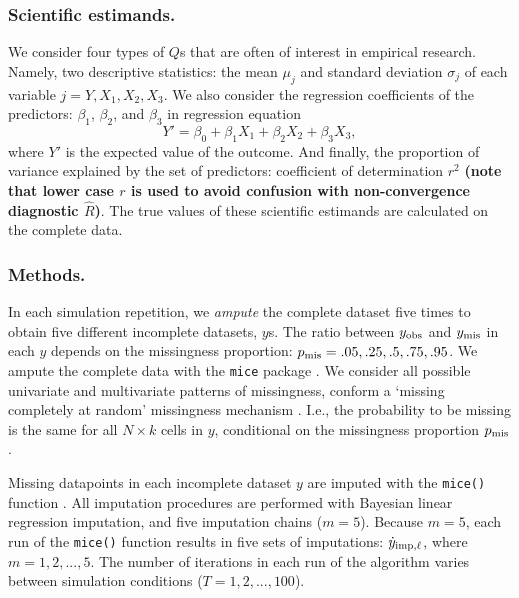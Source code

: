 \documentclass[Royal,times,sageh]{sagej}
\begin{document}
\hypertarget{scientific-estimands.}{%
\subsubsection{Scientific estimands.}\label{scientific-estimands.}}

We consider four types of \(Q\)s that are often of interest in empirical research. Namely, two descriptive statistics: the mean \(\mu_j\) and standard deviation \(\sigma_j\) of each variable \(j = Y, X_1, X_2, X_3\). We also consider the regression coefficients of the predictors: \(\beta_1\), \(\beta_2\), and \(\beta_3\) in regression equation
\[Y' = \beta_0 + \beta_1 X_1 + \beta_2 X_2 + \beta_3 X_3,\]
where \(Y'\) is the expected value of the outcome. And finally, the proportion of variance explained by the set of predictors: coefficient of determination \(r^2\) \textbf{(note that lower case \(r\) is used to avoid confusion with non-convergence diagnostic \(\widehat{R}\))}. The true values of these scientific estimands are calculated on the complete data.

\hypertarget{methods.}{%
\subsubsection{Methods.}\label{methods.}}

In each simulation repetition, we \emph{ampute} the complete dataset five times to obtain five different incomplete datasets, \(y\)s. The ratio between \(y_{\rm obs}\) and \(y_{\rm mis}\) in each \(y\) depends on the missingness proportion: \(p_{\rm mis} =.05,.25,.5,.75,.95\). We ampute the complete data with the \texttt{mice} package \citep[function \texttt{mice::ampute()};][]{mice}. We consider all possible univariate and multivariate patterns of missingness, conform a `missing completely at random' missingness mechanism \citep{rubin87}. I.e., the probability to be missing is the same for all \(N \times k\) cells in \(y\), conditional on the missingness proportion \(p_{\rm mis}\).

Missing datapoints in each incomplete dataset \(y\) are imputed with the \texttt{mice()} function \citep{mice}. All imputation procedures are performed with Bayesian linear regression imputation, and five imputation chains (\(m=5\)). Because \(m=5\), each run of the \texttt{mice()} function results in five sets of imputations: \(\dot y_{\rm imp, \ell}\), where \(m = 1, 2, ..., 5\). The number of iterations in each run of the algorithm varies between simulation conditions (\(T=1,2,...,100\)).
\end{document}
